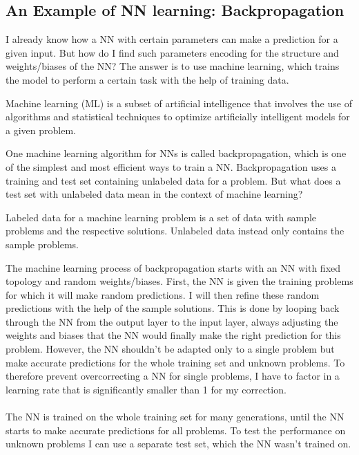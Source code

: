 \documentclass[11pt]{report}
\newcommand{\mydeflabel}{}
\newenvironment{mydef}[1]
{\renewcommand\mydeflabel{#1}\begin{mydefinner}}
{\end{mydefinner}}
\begin{document}
    \subsection{An Example of NN learning: Backpropagation}\label{subsec:an-example-of-nn-learning:-backpropagation}
    I already know how a NN with certain parameters can make a prediction for a given input.
    But how do I find such parameters encoding for the structure and weights/biases of the NN?
    The answer is to use machine learning, which trains the model to perform a certain task with the help of training data.
    \begin{mydef}{Machine Learning}
        Machine learning (ML) is a subset of artificial intelligence that involves the use of algorithms and statistical techniques to optimize artificially intelligent models for a given problem.
    \end{mydef}
    One machine learning algorithm for NNs is called backpropagation, which is one of the simplest and most efficient ways to train a NN.\@
    Backpropagation uses a training and test set containing unlabeled data for a problem.
    But what does a test set with unlabeled data mean in the context of machine learning?
    \begin{mydef}{(Un)labeled Data}
        Labeled data for a machine learning problem is a set of data with sample problems and the respective solutions.
        Unlabeled data instead only contains the sample problems.
    \end{mydef}
    The machine learning process of backpropagation starts with an NN with fixed topology and random weights/biases.
    First, the NN is given the training problems for which it will make random predictions.
    I will then refine these random predictions with the help of the sample solutions.
    This is done by looping back through the NN from the output layer to the input layer, always adjusting the weights and biases that the NN would finally make the right prediction for this problem.
    However, the NN shouldn't be adapted only to a single problem but make accurate predictions for the whole training set and unknown problems.
    To therefore prevent overcorrecting a NN for single problems, I have to factor in a learning rate that is significantly smaller than 1 for my correction.
    \\ \\
    The NN is trained on the whole training set for many generations, until the NN starts to make accurate predictions for all problems.
    To test the performance on unknown problems I can use a separate test set, which the NN wasn't trained on.
\end{document}
